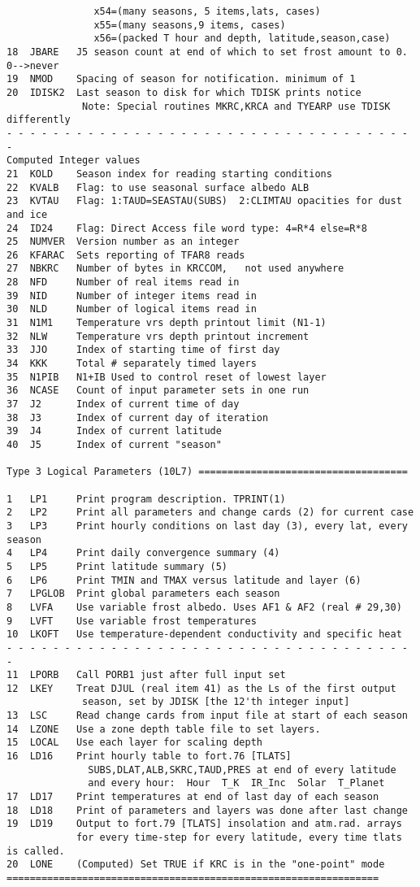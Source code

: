 \documentclass{article}
\begin{document}
\begin{verbatim}
               x54=(many seasons, 5 items,lats, cases)
               x55=(many seasons,9 items, cases)
               x56=(packed T hour and depth, latitude,season,case)
18  JBARE   J5 season count at end of which to set frost amount to 0. 0-->never
19  NMOD    Spacing of season for notification. minimum of 1
20  IDISK2  Last season to disk for which TDISK prints notice
             Note: Special routines MKRC,KRCA and TYEARP use TDISK differently
- - - - - - - - - - - - - - - - - - - - - - - - - - - - - - - - - - - - 
Computed Integer values
21  KOLD    Season index for reading starting conditions
22  KVALB   Flag: to use seasonal surface albedo ALB
23  KVTAU   Flag: 1:TAUD=SEASTAU(SUBS)  2:CLIMTAU opacities for dust and ice
24  ID24    Flag: Direct Access file word type: 4=R*4 else=R*8
25  NUMVER  Version number as an integer
26  KFARAC  Sets reporting of TFAR8 reads
27  NBKRC   Number of bytes in KRCCOM,   not used anywhere
28  NFD     Number of real items read in
39  NID     Number of integer items read in
30  NLD     Number of logical items read in
31  N1M1    Temperature vrs depth printout limit (N1-1)
32  NLW     Temperature vrs depth printout increment
33  JJO     Index of starting time of first day
34  KKK     Total # separately timed layers
35  N1PIB   N1+IB Used to control reset of lowest layer
36  NCASE   Count of input parameter sets in one run
37  J2      Index of current time of day
38  J3      Index of current day of iteration
39  J4      Index of current latitude
40  J5      Index of current "season"

Type 3 Logical Parameters (10L7) ====================================

1   LP1     Print program description. TPRINT(1) 
2   LP2     Print all parameters and change cards (2) for current case
3   LP3     Print hourly conditions on last day (3), every lat, every season
4   LP4     Print daily convergence summary (4)
5   LP5     Print latitude summary (5)
6   LP6     Print TMIN and TMAX versus latitude and layer (6)
7   LPGLOB  Print global parameters each season
8   LVFA    Use variable frost albedo. Uses AF1 & AF2 (real # 29,30)
9   LVFT    Use variable frost temperatures
10  LKOFT   Use temperature-dependent conductivity and specific heat
- - - - - - - - - - - - - - - - - - - - - - - - - - - - - - - - - - - - 
11  LPORB   Call PORB1 just after full input set
12  LKEY    Treat DJUL (real item 41) as the Ls of the first output
             season, set by JDISK [the 12'th integer input]
13  LSC     Read change cards from input file at start of each season
14  LZONE   Use a zone depth table file to set layers.
15  LOCAL   Use each layer for scaling depth
16  LD16    Print hourly table to fort.76 [TLATS] 
              SUBS,DLAT,ALB,SKRC,TAUD,PRES at end of every latitude
              and every hour:  Hour  T_K  IR_Inc  Solar  T_Planet
17  LD17    Print temperatures at end of last day of each season
18  LD18    Print of parameters and layers was done after last change
19  LD19    Output to fort.79 [TLATS] insolation and atm.rad. arrays 
            for every time-step for every latitude, every time tlats is called.
20  LONE    (Computed) Set TRUE if KRC is in the "one-point" mode
================================================================


\end{verbatim}
\end{document}
